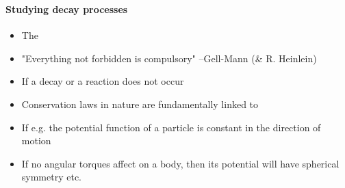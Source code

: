 \begin{frame}
\frametitle{\texorpdfstring{\culine[\sectiontitleulinecolor]{\sectiontitle}}{\sectiontitle} }
%
\framesubtitle{Studying decay processes}

\begin{itemize}
	\item The  
	\item[] "Everything not forbidden is compulsory" –Gell-Mann (\& R. Heinlein)%
	\item If a decay or a reaction does not occur 
	
	
	\item Conservation laws in nature are fundamentally linked to 
	
	\item If e.g. the potential function of a particle is constant in the direction of motion 
	
	\item If no angular torques affect on a body, then its potential will have spherical symmetry etc.

\end{itemize}

%

\endofslide 
\end{frame}

